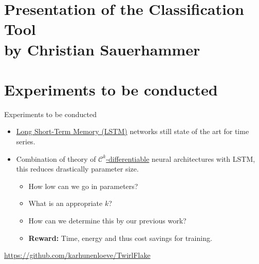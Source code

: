 \documentclass[aspectratio=169,t]{beamer}
\begin{document}
\section{Presentation of the Classification Tool\\
\small{by Christian Sauerhammer}}

\section{Experiments to be conducted}
  { 
    \begin{frame}{Experiments to be conducted}
    \begin{itemize}
      \item \href{https://ieeexplore.ieee.org/document/7508408/}{Long Short-Term Memory (LSTM)} networks still state of the art for time series.
      \item Combination of theory of \href{https://arxiv.org/pdf/1806.03751.pdf}{$\mathcal{C}^k$-differentiable} neural architectures with LSTM, this reduces drastically parameter size.
      \begin{itemize}
          \item How low can we go in parameters?
          \item What is an appropriate $k$?
          \item How can we determine this by our previous work?
          \item \textbf{Reward:} Time, energy and thus cost savings for training.
      \end{itemize}
    \end{itemize}
    \faGithub \; \href{https://github.com/karhunenloeve/TwirlFlake}{https://github.com/karhunenloeve/TwirlFlake} \\

    \end{frame}
  }
\end{document}
